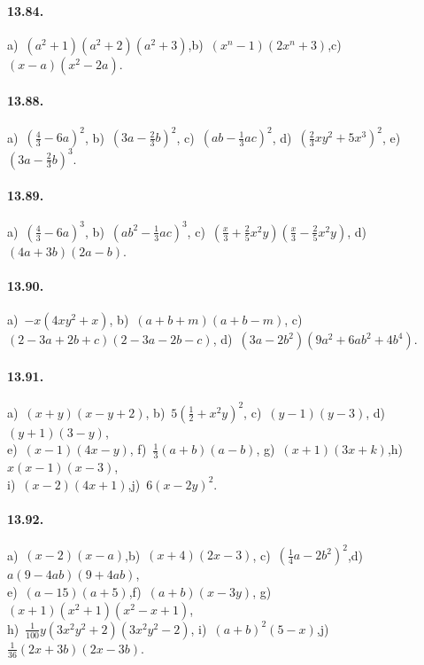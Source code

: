 \paragraph{13.84.} a)~$(a^{2}+1)(a^{2}+2)(a^{2}+3)$,\quad b)~$(x^{n}-1)(2x^{n}+3)$,\quad c)~$(x-a)\left(x^{2}-2a\right)$.

\paragraph{13.88.} a)~$\left(\frac{4}{3}-6a\right)^{2}$,\quad
b)~$\left(3a-\frac{2}{3}b\right)^{2}$,\quad
c)~$\left(ab-\frac{1}{3}ac\right)^{2}$,\quad
d)~$\left(\frac{2}{3}xy^{2}+5x^{3}\right)^{2}$,\quad
e)~$\left(3a-\frac{2}{3}b\right)^{3}$.

\paragraph{13.89.} a)~$\left(\frac{4}{3}-6a\right)^{3}$,\quad
b)~$\left(ab^{2}-\frac{1}{3}ac\right)^{3}$,\quad
c)~$\left(\frac{x}{3}+\frac{2}{5}x^{2}y\right)\left(\frac{x}{3}-\frac{2}{5}x^{2}y\right)$,\quad
d)~$(4a+3b)(2a-b)$.

\paragraph{13.90.} a)~$-x\left(4xy^{2}+x\right)$,\quad
b)~$(a+b+m)(a+b-m)$,\quad
c)~$(2-3a+2b+c)(2-3a-2b-c)$,\quad
d)~$\left(3a-2b^{2}\right)\left(9a^{2}+6ab^{2}+4b^{4}\right)$.

\paragraph{13.91.} a)~$(x+y)\left(x-y+2\right)$,\quad
b)~$5\left(\frac{1}{2}+x^{2}y\right)^{2}$,\quad
c)~$(y-1)\left(y-3\right)$,\quad
d)~$(y+1)\left(3-y\right)$,\protect\\
e)~$(x-1)\left(4x-y\right)$,\quad
f)~$\frac{1}{3}(a+b)\left(a-b\right)$,\quad
g)~$(x+1)\left(3x+k\right)$,\quad h)~$x(x-1)\left(x-3\right)$,\protect\\
i)~$(x-2)\left(4x+1\right)$,\quad j)~$6\left(x-2y\right)^{2}$.

\paragraph{13.92.} a)~$(x-2)\left(x-a\right)$,\quad b)~$(x+4)\left(2x-3\right)$,\quad
c)~$\left(\frac{1}{4}a-2b^{2}\right)^{2}$,\quad d)~$a(9-4{ab})(9+4{ab})$,\quad \protect\\
e)~$(a-15)(a+5)$,\quad f)~$(a+b)(x-3y)$,\quad
g)~$(x+1)\left(x^{2}+1\right)\left(x^{2}-x+1\right)$,\protect\\
h)~$\frac{1}{100}y\left(3x^{2}y^{2}+2\right)\left(3x^{2}y^{2}-2\right)$,\quad
i)~$(a+b)^{2}\left(5-x\right)$,\quad j)~$\frac{1}{36}(2x+3b)\left(2x-3b\right)$.

